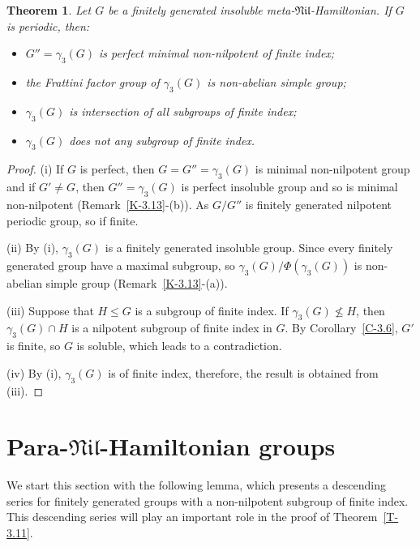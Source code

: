 \documentclass[11pt]{amsart}
\newtheorem{theorem}{Theorem}[section]
\newcommand{\sub}{\leqslant}
\newcommand{\nsub}{\nleqslant}
\newcommand{\nil}{\mathfrak{Nil}}
\begin{document}
\begin{theorem}
Let $G$ be a finitely generated insoluble meta-$\nil$-Hamiltonian. If $G$ is periodic, then:
\begin{itemize}
\item[(i)] $G''=\gamma_3(G)$ is perfect minimal non-nilpotent of finite index;
\item[(ii)]  the Frattini factor group of  $\gamma_3(G)$ is non-abelian simple group;
\item[(iii)] $\gamma_3(G)$ is intersection of all subgroups of finite index;
\item[(iv)] $\gamma_3(G)$ does not any subgroup of finite index.
\end{itemize} 
\end{theorem}
\begin{proof}
(i) If $G$ is perfect, then $G=G''=\gamma_3(G)$ is minimal non-nilpotent group and if $G'\neq G$, then $G''=\gamma_3(G)$ is perfect insoluble group and so is minimal non-nilpotent (Remark~\ref{K-3.13}-(b)). As $G/G''$ is finitely generated nilpotent periodic group, so if finite. 

(ii) By (i), $\gamma_3(G)$ is a finitely generated insoluble group. Since every finitely generated group have a maximal subgroup, so  $\gamma_3(G)/\Phi(\gamma_3(G))$ is non-abelian simple group (Remark~\ref{K-3.13}-(a)).

(iii) Suppose that $H\sub G$ is a subgroup of  finite index. If $\gamma_3(G)\nsub H$, then $\gamma_3(G)\cap H$ is a nilpotent subgroup of finite index in $G$. By Corollary~\ref{C-3.6}, $G'$ is finite, so $G$ is soluble, which  leads to a contradiction. 

(iv) By (i), $\gamma_3(G)$ is of finite index, therefore, the result is obtained from (iii).
\end{proof}

\section{Para-$\mathfrak{Nil}$-Hamiltonian groups}
We start this section with the following lemma, which presents a descending series for finitely generated groups with a non-nilpotent subgroup of finite index. This descending series will play an important role in the proof of Theorem~\ref{T-3.11}.
\end{document}

